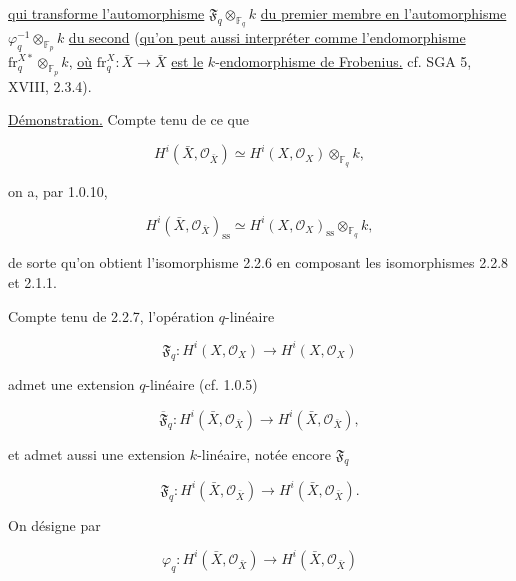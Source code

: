 \underline{qui transforme l'automorphisme}
$\mathfrak F_q\otimes_{\mathbb F_q}k$ \underline{du premier membre en l'automorphisme}
$\varphi_q^{-1}\otimes_{\mathbb F_p}k$ \underline{du second} (\underline{qu'on peut aussi interpréter
comme l'endomorphisme} $\mathrm{fr}_q^{X*}\otimes_{\mathbb F_p}k$, \underline{où}
$\mathrm{fr}_q^X:\bar X\longrightarrow\bar X$ \underline{est le} $k$-\underline{endomorphisme de
Frobenius.} cf. SGA 5, XVIII, 2.3.4).

\underline{Démonstration.} Compte tenu de ce que

\begin{equation}\tag{2.2.7}
H^i(\bar X,\mathcal O_{\bar X})\simeq
H^i(X,\mathcal O_X)\otimes_{\mathbb F_q}k,
\end{equation}

on a, par 1.0.10,

\begin{equation}\tag{2.2.8}
H^i(\bar X,\mathcal O_{\bar X})_{\mathrm{ss}}
\simeq H^i(X,\mathcal O_X)_{\mathrm{ss}}\otimes_{\mathbb F_q}k,
\end{equation}

de sorte qu'on obtient l'isomorphisme 2.2.6 en composant les isomorphismes
2.2.8 et 2.1.1.

Compte tenu de 2.2.7, l'opération $q$-linéaire

\begin{equation}\tag{2.2.9}
\mathfrak F_q:H^i(X,\mathcal O_X)\longrightarrow H^i(X,\mathcal O_X)
\end{equation}

admet une extension $q$-linéaire (cf. 1.0.5)

\begin{equation}\tag{2.2.10}
\overline{\mathfrak F}_q:H^i(\bar X,\mathcal O_{\bar X})
\longrightarrow H^i(\bar X,\mathcal O_{\bar X}),
\end{equation}

et admet aussi une extension $k$-linéaire, notée encore
$\mathfrak F_q$

\begin{equation}\tag{2.2.11}
\mathfrak F_q:H^i(\bar X,\mathcal O_{\bar X})
\longrightarrow H^i(\bar X,\mathcal O_{\bar X}).
\end{equation}


On désigne par

\begin{equation}\tag{2.2.12}
\varphi_q:H^i(\bar X,\mathcal O_{\bar X})
\longrightarrow H^i(\bar X,\mathcal O_{\bar X})
\end{equation}

